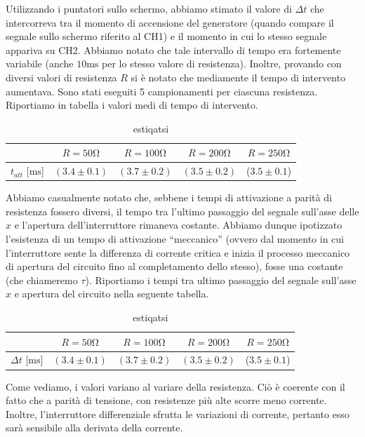 Utilizzando i puntatori sullo schermo, abbiamo stimato il valore di $\Delta t$ che intercorreva tra il momento di accensione del generatore (quando compare il segnale sullo schermo riferito al CH1) e il momento in cui lo stesso segnale appariva su CH2. Abbiamo notato che tale intervallo di tempo era fortemente variabile (anche $10\si{\milli\second}$ per lo stesso valore di resistenza). Inoltre, provando con diversi valori di resistenza $R$ si è notato che mediamente il tempo di intervento aumentava. Sono stati eseguiti 5 campionamenti per ciascuna resistenza. Riportiamo in tabella i valori medi di tempo di intervento.

\begin{table}[h]
\centering
\caption{estiqatsi}
{\renewcommand{\arraystretch}{1.6}%
\begin{tabular}{c|c|c|c|c}
 & $R=50 \si{\ohm}$ & $R=100 \si{\ohm}$ & $R=200 \si{\ohm}$ & $R=250 \si{\ohm}$ \\      \hline
$t_{att}$ [$\si{\milli\second}$] & $(3.4 \pm 0.1)$ & $(3.7 \pm 0.2)$ & $(3.5 \pm 0.2)$ & ($3.5 \pm 0.1$) \\
\end{tabular}}
\end{table}


Abbiamo casualmente notato che, sebbene i tempi di attivazione a parità di resistenza fossero diversi, il tempo tra l'ultimo passaggio del segnale sull'asse delle $x$ e l'apertura dell'interruttore rimaneva costante. Abbiamo dunque ipotizzato l'esistenza di un tempo di attivazione ``meccanico'' (ovvero dal momento in cui l'interruttore sente la differenza di corrente critica e inizia il processo meccanico di apertura del circuito fino al completamento dello stesso), fosse una costante (che chiameremo $\tau$).  Riportiamo i tempi tra ultimo passaggio del segnale sull'asse $x$ e apertura del circuito nella seguente tabella. 

\begin{table}[h]
\centering
\caption{estiqatsi}
{\renewcommand{\arraystretch}{1.6}%
\begin{tabular}{c|c|c|c|c}
 & $R=50 \si{\ohm}$ & $R=100 \si{\ohm}$ & $R=200 \si{\ohm}$ & $R=250 \si{\ohm}$ \\      \hline
$\Delta t$ [$\si{\milli\second}$] & $(3.4 \pm 0.1)$ & $(3.7 \pm 0.2)$ & $(3.5 \pm 0.2)$ & ($3.5 \pm 0.1$) \\
\end{tabular}}
\end{table}

Come vediamo, i valori variano al variare della resistenza. Ciò è coerente con il fatto che a parità di tensione, con resistenze più alte scorre meno corrente. Inoltre, l'interruttore differenziale sfrutta le variazioni di corrente, pertanto esso sarà sensibile alla derivata della corrente.

